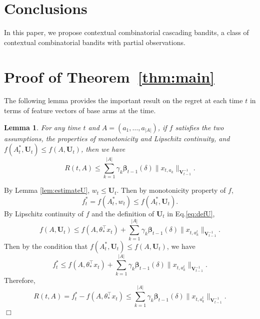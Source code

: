 \documentclass{article}
\newcommand{\bbeta}{\boldsymbol{\beta}}
\newcommand{\bU}{\mathbf{U}}
\newcommand{\bV}{\mathbf{V}}
\newcommand{\abs}[1]{\left| #1 \right|}
\newcommand{\norm}[1]{\| #1 \|}
\newtheorem{lemma}[theorem]{Lemma}%
\newenvironment{proof}{\noindent {\textbf{Proof. }}}{$\Box$ \medskip}
\begin{document}



\section{Conclusions}

In this paper, we propose contextual combinatorial cascading bandits, a class of contextual combinatorial bandits with partial observations. 


	



\appendix

\section{Proof of Theorem~\ref{thm:main}}

The following lemma provides the important result on the regret at each time $t$ in terms of feature vectors of base arms at the time.

\begin{lemma} %
	\label{lem:DeltaEstimate}
	For any time $t$ and $A = (a_1, \ldots, a_{\abs{A}})$, if $f$ satisfies the two assumptions, the properties of monotonicity and Lipschitz continuity, and $f(A_t^*, \bU_t) \leq f(A, \bU_t)$, then we have
	$$
		R(t,A) \leq \sum_{k=1}^{\abs{A}} \gamma_k \bbeta_{t-1}(\delta)\norm{x_{t,a_k}}_{\bV_{t-1}^{-1}}.
	$$
\end{lemma}
\begin{proof}
	By Lemma \ref{lem:estimateU}, $w_t \leq \bU_t$. Then by monotonicity property of $f$,
	$$
	f_t^{\ast} = f(A_t^{\ast}, w_t) \leq f(A_t^{\ast}, \bU_t).
	$$
	By Lipschitz continuity of $f$ and the definition of $\bU_t$ in Eq.\eqref{eq:defU},
	$$
	f(A, \bU_t) \leq f(A, \theta_{\ast}^{\top}x_t) + \sum_{k=1}^{\abs{A}} \gamma_k \bbeta_{t-1}(\delta)\norm{x_{t, a_k^t}}_{\bV_{t-1}^{-1}}.
	$$
	Then by the condition that $f(A_t^{\ast}, \bU_t) \leq f(A, \bU_t)$, we have 
	$$
	f_t^{\ast} \leq f(A, \theta_{\ast}^{\top}x_t) + \sum_{k=1}^{\abs{A}} \gamma_k \bbeta_{t-1}(\delta)\norm{x_{t, a_k^t}}_{\bV_{t-1}^{-1}}.
	$$
	Therefore,
	$$
	R(t, A) = f_t^{\ast} - f(A, \theta_{\ast}^{\top}x_t) \leq \sum_{k=1}^{\abs{A}} \gamma_k \bbeta_{t-1}(\delta)\norm{x_{t, a_k^t}}_{\bV_{t-1}^{-1}}.
	$$
\end{proof}
\end{document}
